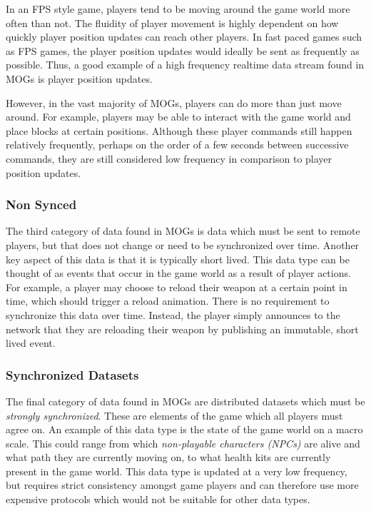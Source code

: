 In an FPS style game, players tend to be moving around the game world more often than not. The fluidity of player movement is highly dependent on how quickly player position updates can reach other players. In fast paced games such as FPS games, the player position updates would ideally be sent as frequently as possible. Thus, a good example of a high frequency realtime data stream found in MOGs is player position updates.

However, in the vast majority of MOGs, players can do more than just move around. For example, players may be able to interact with the game world and place blocks at certain positions. Although these player commands still happen relatively frequently, perhaps on the order of a few seconds between successive commands, they are still considered low frequency in comparison to player position updates. 

\subsubsection*{Non Synced}
The third category of data found in MOGs is data which must be sent to remote players, but that does not change or need to be synchronized over time. Another key aspect of this data is that it is typically short lived. This data type can be thought of as events that occur in the game world as a result of player actions. For example, a player may choose to reload their weapon at a certain point in time, which should trigger a reload animation. There is no requirement to synchronize this data over time. Instead, the player simply announces to the network that they are reloading their weapon by publishing an immutable, short lived event.

\subsubsection*{Synchronized Datasets}       
The final category of data found in MOGs are distributed datasets which must be \textit{strongly synchronized}. These are elements of the game which all players must agree on. An example of this data type is the state of the game world on a macro scale. This could range from which \textit{non-playable characters (NPCs)} are alive and what path they are currently moving on, to what health kits are currently present in the game world. This data type is updated at a very low frequency, but requires strict consistency amongst game players and can therefore use more expensive protocols which would not be suitable for other data types.


